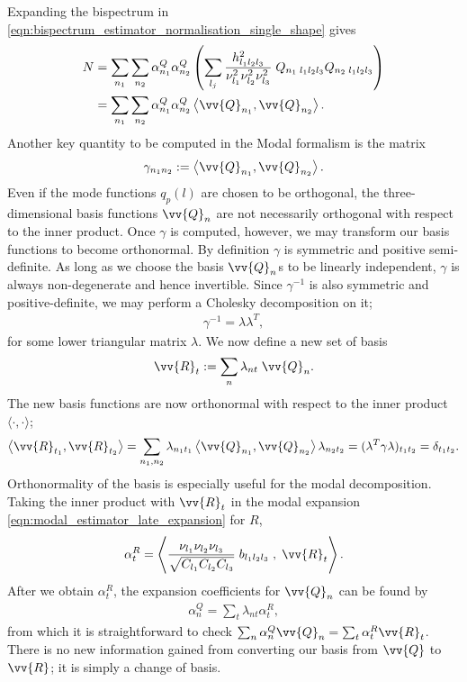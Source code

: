 \documentclass[a4paper,12pt,times,custombib,print,index]{Classes/PhDThesisPSnPDF} %
\begin{document}
Expanding the bispectrum in \eqref{eqn:bispectrum_estimator_normalisation_single_shape} gives
\begin{align}
	N &= \sum_{n_1} \sum_{n_2} \alpha^Q_{n_1} \alpha^Q_{n_2} \left( \sum_{l_j} \frac{h^2_{l_1 l_2 l_3}}{\nu_{l_1}^2 \nu_{l_2}^2 \nu_{l_3}^2 } \; Q_{n_1 \; l_1 l_2 l_3} Q_{n_2 \; l_1 l_2 l_3} \right) \\
	&= \sum_{n_1} \sum_{n_2} \alpha^Q_{n_1} \alpha^Q_{n_2} \left< \vv{Q}_{n_1}, \vv{Q}_{n_2} \right>. \label{eqn:modal_estimator_normalisation_Q}
\end{align}
Another key quantity to be computed in the Modal formalism is the matrix
\begin{align}
	\gamma_{n_1 n_2} :=  \left< \vv{Q}_{n_1} , \vv{Q}_{n_2} \right>.
\end{align}
Even if the mode functions $q_p(l)$ are chosen to be orthogonal, the three-dimensional basis functions $\vv{Q}_n$ are not necessarily orthogonal with respect to the inner product. Once $\gamma$ is computed, however, we may transform our basis functions to become orthonormal. By definition $\gamma$ is symmetric and positive semi-definite. As long as we choose the basis $\vv{Q}_n$s to be linearly independent, $\gamma$ is always non-degenerate and hence invertible. Since $\gamma^{-1}$ is also symmetric and positive-definite, we may perform a Cholesky decomposition on it;
\begin{align}
	\gamma^{-1} = \lambda \lambda^T,
\end{align}
for some lower triangular matrix $\lambda$. We now define a new set of basis
\begin{align}
	\vv{R}_t := \sum_n \lambda_{nt} \; \vv{Q}_{n}.
\end{align}
The new basis functions are now orthonormal with respect to the inner product $\langle \cdot,\cdot \rangle$;
\begin{align}
	\left< \vv{R}_{t_1} , \vv{R}_{t_2} \right> = \sum_{n_1,n_2} \lambda_{n_1 t_1} \left< \vv{Q}_{n_1} , \vv{Q}_{n_2} \right> \lambda_{n_2 t_2} = (\lambda^T \gamma \lambda)_{t_1 t_2} = \delta_{t_1 t_2}.
\end{align}
Orthonormality of the basis is especially useful for the modal decomposition. Taking the inner product with $\vv{R}_t$ in the modal expansion \eqref{eqn:modal_estimator_late_expansion} for $R$,
\begin{align}
	\alpha^R_t = \left< \frac{\nu_{l_1} \nu_{l_2} \nu_{l_3}}{\sqrt{C_{l_1} C_{l_2} C_{l_3}}} \; b_{l_1 l_2 l_3} \;,\; \vv{R}_t \right>.
\end{align}
After we obtain $\alpha^R_t$, the expansion coefficients for $\vv{Q}_n$ can be found by
\begin{align}
	\alpha^Q_n = \sum_t \lambda_{nt} \alpha^R_t,
\end{align}
from which it is straightforward to check $\sum_n \alpha^Q_n \vv{Q}_n = \sum_t \alpha^R_t \vv{R}_t$. There is no new information gained from converting our basis from $\vv{Q}$ to $\vv{R}$; it is simply a change of basis.
\end{document}
